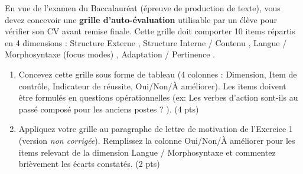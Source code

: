 \documentclass[11pt]{article}
\begin{document}
\begin{exercice}
En vue de l'examen du Baccalauréat (épreuve de production de texte), vous devez concevoir une \textbf{grille d'auto-évaluation} utilisable par un élève pour vérifier son CV avant remise finale. Cette grille doit comporter 10 items répartis en 4 dimensions : \og Structure Externe \fg{}, \og Structure Interne / Contenu \fg{}, \og Langue / Morphosyntaxe (focus modes) \fg{}, \og Adaptation / Pertinence \fg{}.

\begin{enumerate}
    \item Concevez cette grille sous forme de tableau (4 colonnes : Dimension, Item de contrôle, Indicateur de réussite, Oui/Non/À améliorer). Les items doivent être formulés en questions opérationnelles (ex: \og Les verbes d'action sont-ils au passé composé pour les anciens postes ? \fg{}). (4 pts)
    \item Appliquez votre grille au paragraphe de lettre de motivation de l'Exercice 1 (version \textit{non corrigée}). Remplissez la colonne \og Oui/Non/À améliorer \fg{} pour les items relevant de la dimension \og Langue / Morphosyntaxe \fg{} et commentez brièvement les écarts constatés. (2 pts)
\end{enumerate}
\end{exercice}
\end{document}
